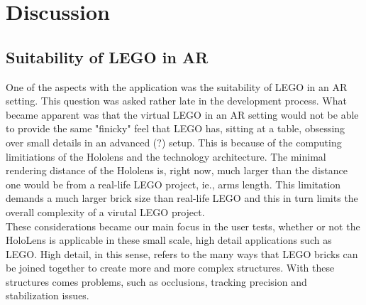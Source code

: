 
\section{Discussion}
\subsection{Suitability of LEGO in AR}
One of the aspects with the application was the suitability of LEGO in an AR setting. This question was asked rather late in the development process. What became apparent was that the virtual LEGO in an AR setting would not be able to provide the same "finicky" feel that LEGO has, sitting at a table, obsessing over small details in an advanced (?) setup. This is because of the computing limitiations of the Hololens and the technology architecture. The minimal rendering distance of the Hololens is, right now, much larger than the distance one would be from a real-life LEGO project, ie., arms length. This limitation demands a much larger brick size than real-life LEGO and this in turn limits the overall complexity of a virutal LEGO project. \\
These considerations became our main focus in the user tests, whether or not the HoloLens is applicable in these small scale, high detail applications such as LEGO. High detail, in this sense, refers to the many ways that LEGO bricks can be joined together to create more and more complex structures. With these structures comes problems, such as occlusions, tracking precision and stabilization issues. 